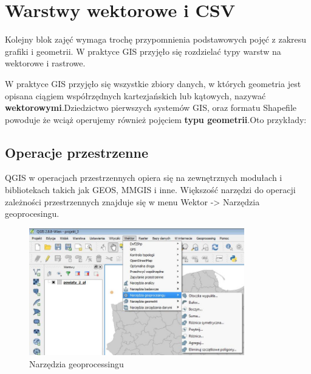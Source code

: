 \documentclass[12pt,a4paper]{book}
\begin{document}
\chapter{Warstwy wektorowe i CSV}
Kolejny blok zajęć wymaga trochę przypomnienia podstawowych pojęć z zakresu grafiki i geometrii. W praktyce GIS przyjęło się rozdzielać typy warstw na wektorowe i rastrowe.

W praktyce GIS przyjęło się wszystkie zbiory danych, w których geometria jest opisana ciągiem współrzędnych kartezjańskich lub kątowych, nazywać \textbf{wektorowymi}.Dziedzictwo pierwszych systemów GIS, oraz formatu Shapefile powoduje że wciąż operujemy również pojęciem \textbf{typu geometrii}.Oto przykłady:

\section{Operacje przestrzenne}
QGIS w operacjach przestrzennych opiera się na zewnętrznych modułach i bibliotekach takich jak GEOS, MMGIS i inne. Większość narzędzi do operacji zależności przestrzennych znajduje się w menu Wektor -{\textgreater} Narzędzia geoprocesingu.

\begin{center}
\begin{figure}
\caption{Narzędzia geoprocessingu}
\includegraphics[width=9.37cm,height=5.514cm]{003-geoprocessing.jpg}
\end{figure}
\end{center}
\end{document}
